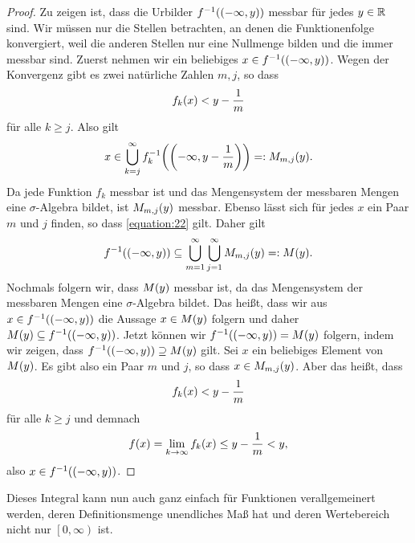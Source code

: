 \begin{proof}
	Zu zeigen ist, dass die Urbilder \(f^{-1}\parentheses*{\parentheses*{-\infty, y}}\) messbar für jedes \(y \in \mathbb{R}\) sind.
	Wir müssen nur die Stellen betrachten, an denen die Funktionenfolge konvergiert, weil die anderen Stellen nur eine Nullmenge bilden und die immer messbar sind.
	Zuerst nehmen wir ein beliebiges \(x \in f^{-1}\parentheses*{\parentheses*{-\infty, y}}\).
	Wegen der Konvergenz gibt es zwei natürliche Zahlen \(m, j\), so dass
	\[
		f_k\parentheses*{x} < y - \frac{1}{m}
	\]
	für alle \(k \ge j\).
	Also gilt
	\begin{equation}\label{equation:22}
		x \in \bigcup_{k = j}^\infty f_k^{-1}\parentheses*{\parentheses*{-\infty, y - \frac{1}{m}}} =: M_{m, j}\parentheses*{y}.
	\end{equation}
	Da jede Funktion \(f_k\) messbar ist und das Mengensystem der messbaren Mengen eine \(\sigma\)-Algebra bildet, ist \(M_{m, j}\parentheses*{y}\) messbar.
	Ebenso lässt sich für jedes \(x\) ein Paar \(m\) und \(j\) finden, so dass \eqref{equation:22} gilt.
	Daher gilt
	\[
		f^{-1}\parentheses*{\parentheses*{-\infty, y}} \subseteq \bigcup_{m = 1}^\infty \bigcup_{j = 1}^\infty M_{m, j}\parentheses*{y} =: M\parentheses*{y}.
	\]
	Nochmals folgern wir, dass \(M\parentheses*{y}\) messbar ist, da das Mengensystem der messbaren Mengen eine \(\sigma\)-Algebra bildet.
	Das heißt, dass wir aus \(x \in f^{-1}\parentheses*{\parentheses*{-\infty, y}}\) die Aussage \(x \in M\parentheses*{y}\) folgern und daher \(M\parentheses*{y} \subseteq f^{-1}\parentheses*{\parentheses*{-\infty, y}}\).
	Jetzt können wir \(f^{-1}\parentheses*{\parentheses*{-\infty, y}} = M\parentheses*{y}\) folgern, indem wir zeigen, dass \(f^{-1}\parentheses*{\parentheses*{-\infty, y}} \supseteq M\parentheses*{y}\) gilt.
	Sei \(x\) ein beliebiges Element von \(M\parentheses*{y}\).
	Es gibt also ein Paar \(m\) und \(j\), so dass \(x \in M_{m, j}\parentheses*{y}\).
	Aber das heißt, dass
	\[
		f_k\parentheses*{x} < y - \frac{1}{m}
	\]
	für alle \(k \ge j\) und demnach
	\[
		f\parentheses*{x} = \lim_{k \to \infty}f_k\parentheses*{x} \le y - \frac{1}{m} < y,
	\]
	also \(x \in f^{-1}\parentheses*{\parentheses*{-\infty, y}}\).
\end{proof}

Dieses Integral kann nun auch ganz einfach für Funktionen verallgemeinert werden, deren Definitionsmenge unendliches Maß hat und deren Wertebereich nicht nur \(\left[0, \infty\right)\) ist.

